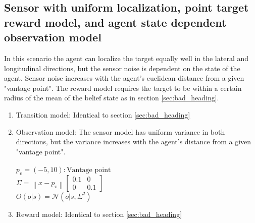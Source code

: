	\subsection{Sensor with uniform localization, point target reward model, and agent state dependent observation model \label{sec:vantage}}
	In this scenario the agent can localize the target equally well in the lateral and longitudinal directions, but the sensor noise is dependent on the state of the agent. Sensor noise increases with the agent's euclidean distance from a given "vantage point". The reward model requires the target to be within a certain radius of the mean of the belief state as in section \ref{sec:bad_heading}.
		\begin{enumerate}[label=(\alph*)]
		\item Transition model: Identical to section \ref{sec:bad_heading}
		\item Observation model: The sensor model has uniform variance in both directions, but the variance increases with the agent's distance from a given "vantage point".\\\\
		$p_v = (-5,10) : \text{Vantage point}$\\
		$\Sigma = \left \| x-p_v \right \| \begin{bmatrix}
						  0.1 & 0 \\
						  0 & 0.1
						 \end{bmatrix}$\\
		$O(o|s) = \mathcal{N} ( o | s,\Sigma^2)$\\
		\item Reward model: Identical to section \ref{sec:bad_heading}
		\end{enumerate}
		
	